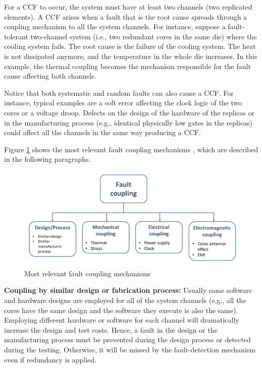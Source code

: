 For a CCF to occur, the system must have at least two channels (two replicated elements). A CCF arises when a fault that is the root cause spreads through a coupling mechanism to all the system channels. For instance, suppose a fault-tolerant two-channel system (i.e., two redundant cores in the same die) where the cooling system fails. The root cause is the failure of the cooling system. The heat is not dissipated anymore, and the temperature in the whole die increases. In this example, the thermal coupling becomes the mechanism responsible for the fault cause affecting both channels.

Notice that both systematic and random faults can also cause a CCF. For instance, typical examples are a soft error affecting the clock logic of the two cores or a voltage droop. Defects on the design of the hardware of the replicas or in the manufacturing process (e.g., identical physically low gates in the replicas) could affect all the channels in the same way producing a CCF.

Figure \ref{fig:Coupling_mechanisms} shows the most relevant fault coupling mechanisms \cite{Tummeltshammer2009}, which are described in the following paragraphs. 

\begin{figure}[h]
    \centering
    \includegraphics[scale=0.5]{img/Coupling_mechanisms.png}
    \caption{Most relevant fault coupling mechanisms}
    \label{fig:Coupling_mechanisms}
\end{figure}

\textbf{Coupling by similar design or fabrication process:} Usually same software and hardware designs are employed for all of the system channels (e.g., all the cores have the same design and the software they execute is also the same). Employing different hardware or software for each channel will dramatically increase the design and test costs. Hence, a fault in the design or the manufacturing process must be prevented during the design process or detected during the testing. Otherwise, it will be missed by the fault-detection mechanism even if redundancy is applied. 

